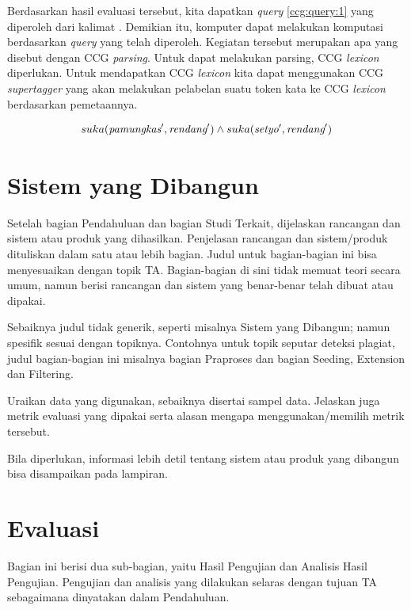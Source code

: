 Berdasarkan hasil evaluasi tersebut, kita dapatkan \textit{query} \ref{ccg:query:1}
yang diperoleh dari kalimat .
Demikian itu, komputer dapat melakukan komputasi berdasarkan \textit{query} yang telah diperoleh.
Kegiatan tersebut merupakan apa yang disebut dengan CCG \textit{parsing}.
Untuk dapat melakukan parsing, CCG \textit{lexicon} diperlukan.
Untuk mendapatkan CCG \textit{lexicon} kita dapat menggunakan CCG \textit{supertagger}
yang akan melakukan pelabelan suatu token kata ke CCG \textit{lexicon} berdasarkan
pemetaannya.

\begin{equation}\label{ccg:query:1}
  suka(\mbox{\it pamungkas}^\prime, \mbox{\it rendang}^\prime) \land suka(\mbox{\it setyo}^\prime, \mbox{\it rendang}^\prime)
\end{equation}



\section{Sistem yang Dibangun}

Setelah bagian Pendahuluan dan bagian Studi Terkait, dijelaskan rancangan dan sistem atau produk yang dihasilkan. Penjelasan rancangan dan sistem/produk dituliskan dalam satu atau lebih bagian. Judul untuk bagian-bagian ini bisa menyesuaikan dengan topik TA. Bagian-bagian di sini tidak memuat teori secara umum, namun berisi rancangan dan sistem yang benar-benar telah dibuat atau dipakai. 

Sebaiknya judul tidak generik, seperti misalnya Sistem yang Dibangun; namun spesifik sesuai dengan topiknya. Contohnya untuk topik seputar deteksi plagiat, judul bagian-bagian ini misalnya bagian Praproses dan bagian Seeding, Extension dan Filtering. 

Uraikan data yang digunakan, sebaiknya disertai sampel data. Jelaskan juga metrik evaluasi yang dipakai serta alasan mengapa menggunakan/memilih metrik tersebut.

Bila diperlukan, informasi lebih detil tentang sistem atau produk yang dibangun bisa disampaikan pada lampiran. 

\section{Evaluasi}

Bagian ini berisi dua sub-bagian, yaitu Hasil Pengujian dan Analisis Hasil Pengujian. Pengujian dan analisis yang dilakukan selaras dengan tujuan TA sebagaimana dinyatakan dalam Pendahuluan.

